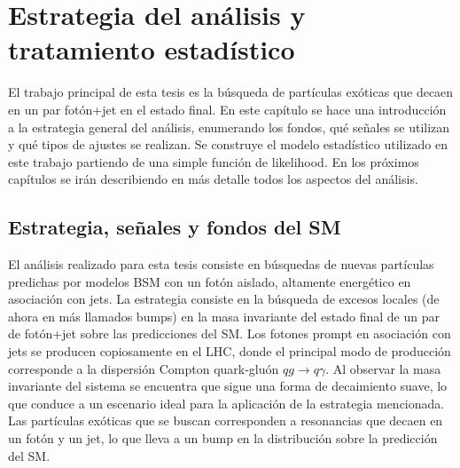 \chapter{Estrategia del an\'alisis y tratamiento estad\'istico}
\label{ch:strategy}







El trabajo principal de esta tesis es la búsqueda de partículas exóticas que decaen en un par fotón+jet en el estado final. En este capítulo se hace una introducción a la estrategia general del análisis, enumerando los fondos, qué señales se utilizan y qu\'e tipos de ajustes se realizan. Se construye el modelo estadístico utilizado en este trabajo partiendo de una simple función de likelihood. En los próximos capítulos se ir\'an describiendo en m\'as detalle todos los aspectos del an\'alisis.






\section{Estrategia, se\~nales y fondos del \acs{SM}}
\label{sec:strategy:strategy}

El análisis realizado para esta tesis consiste en búsquedas de nuevas part\'iculas predichas por modelos \ac{BSM} con un fotón aislado, altamente energético en asociación con jets. La estrategia consiste en la b\'usqueda de excesos locales (de ahora en m\'as llamados bumps) en la masa invariante del estado final de un par de fot\'on+jet sobre las predicciones del \ac{SM}.
Los fotones prompt en asociación con jets se producen copiosamente en el \ac{LHC}, donde el principal modo de producci\'on corresponde a la dispersión Compton quark-gluón \(qg \to q \gamma\). Al observar la masa invariante \myj del sistema \gammajet se encuentra que sigue una forma de decaimiento suave, lo que conduce a un escenario ideal para la aplicaci\'on de la estrategia mencionada.
Las partículas exóticas que se buscan corresponden a resonancias que decaen en un fotón y un jet, lo que lleva a un bump en la distribución \myj sobre la predicción del \ac{SM}.

